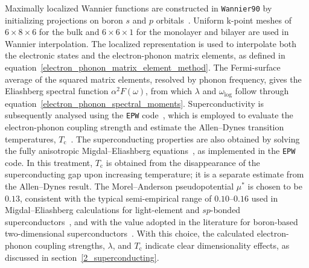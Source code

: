 Maximally localized Wannier functions are constructed in \texttt{Wannier90} by initializing projections on boron $s$ and $p$ orbitals~\cite{pizzi2020wannier90}.
Uniform k-point meshes of $6 \times 8 \times 6$ for the bulk and $6 \times 6 \times 1$ for the monolayer and bilayer are used in Wannier interpolation.
The localized representation is used to interpolate both the electronic states and the electron-phonon matrix elements,
as defined in equation~\eqref{electron_phonon_matrix_element_method}.
The Fermi-surface average of the squared matrix elements, resolved by phonon frequency,
gives the Eliashberg spectral function $\alpha^2F(\omega)$,
from which $\lambda$ and $\omega_\mathrm{log}$ follow through equation~\eqref{electron_phonon_spectral_moments}.
Superconductivity is subsequently analysed using the \texttt{EPW} code~\cite{giannozzi2009quantum,giannozzi2020quantum,giannozzi2017advanced,ponce2016epw},
which is employed to evaluate the electron-phonon coupling strength and estimate the Allen--Dynes transition temperatures, $T_\mathrm{c}$~\cite{margine2013anisotropic}.
The superconducting properties are also obtained by solving the fully anisotropic Migdal--Eliashberg equations~\cite{bardeen1955electron,giustino2017electron,margine2013anisotropic},
as implemented in the \texttt{EPW} code.
In this treatment, $T_\mathrm{c}$ is obtained from the disappearance of the superconducting gap upon increasing temperature;
it is a separate estimate from the Allen--Dynes result.
The Morel--Anderson pseudopotential $\mu^{*}$ is chosen to be $0.13$,
consistent with the typical semi-empirical range of $0.10$--$0.16$ used in Migdal--Eliashberg calculations for light-element and $sp$-bonded superconductors~\cite{allen-dynes},
and with the value adopted in the literature for boron-based two-dimensional superconductors~\cite{zhao2019two}.
With this choice,
the calculated electron-phonon coupling strengths, $\lambda$, and $T_\mathrm{c}$ indicate clear dimensionality effects,
as discussed in section~\ref{2_superconducting}.

